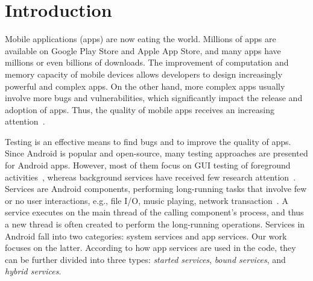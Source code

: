 \documentclass[sigconf,review, anonymous]{acmart}
\begin{document}



\maketitle

\section{Introduction}
Mobile applications (apps) are now eating the world. Millions of apps are available on Google Play Store and Apple App Store, and many apps have millions or even billions of downloads. The improvement of computation and memory capacity of mobile devices allows developers to design increasingly powerful and complex apps. On the other hand, more complex apps usually involve more bugs and vulnerabilities, which significantly impact the release and adoption of apps. Thus, the quality of mobile apps receives an increasing attention~\cite{ReavesBGABCDHKS16,AnandNHY12,MachiryTN13,ChoiNS13,LiuXC14,BanerjeeC0R14,LiuXCL14,HechtBRMD15,BehrouzSBM16,MirzaeiGBSM16,SuMCWYYPLS17}.

Testing is an effective means to find bugs and to improve the quality of apps.
Since Android is popular and open-source, many testing approaches are presented
for Android apps. However, most of them focus on GUI testing of foreground
activities~\cite{monkey,AnandNHY12,MachiryTN13,ChoiNS13,MirzaeiGBSM16,BaekB16,SuMCWYYPLS17,SongQH17},
whereas background services have received few research
attention~\cite{ZhangLLC17}. Services are Android components, performing
long-running tasks that involve few or no user interactions, e.g., file I/O,
music playing, network transaction~\cite{Androidservice}. A service executes on
the main thread of the calling component's process, and thus a new thread is
often created to perform the long-running operations. Services in Android fall
into two categories: system services and app services. Our work focuses on the
latter. According to how app services are used in the code, they can be further
divided into three types: \textit{started services}, \textit{bound services},
and \textit{hybrid services}.
\end{document}
